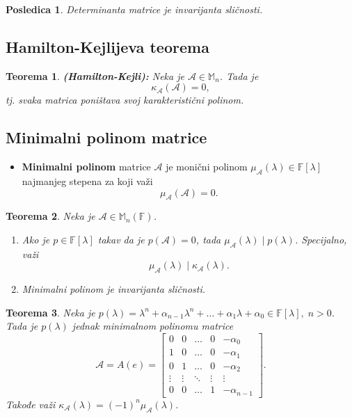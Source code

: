 \documentclass[a4paper,12pt,twoside]{report}
\newtheorem{theorem}{Teorema}[section]
\newtheorem{corollary}{Posledica}[theorem]
\numberwithin{algorithm}{section}
\begin{document}
\begin{corollary}
    Determinanta matrice je invarijanta sličnosti.
\end{corollary}

\subsection{Hamilton-Kejlijeva teorema}

\begin{theorem}
    \textbf{(Hamilton-Kejli):} Neka je $\mathcal{A} \in \mathbb{M}_n$. Tada je \[ \kappa_\mathcal{A}(\mathcal{A}) = 0, \]
    tj. svaka matrica poništava svoj karakteristični polinom.
\end{theorem}

\subsection{Minimalni polinom matrice}

\begin{itemize}
    \item \textbf{Minimalni polinom} matrice $\mathcal{A}$ je monični polinom $\mu_\mathcal{A}(\lambda) \in \mathbb{F}[\lambda]$ 
    najmanjeg stepena za koji važi \[ \mu_\mathcal{A}(\mathcal{A})=0. \]
\end{itemize}

\begin{theorem}
    Neka je $\mathcal{A}\in \mathbb{M}_n(\mathbb{F})$.
    \begin{enumerate}
        \item Ako je $p \in \mathbb{F}[\lambda]$ takav da je $p(\mathcal{A}) = 0$, tada $\mu_\mathcal{A}(\lambda)\;|\;p(\lambda)$.
        Specijalno, važi \[\mu_\mathcal{A}(\lambda)\;|\;\kappa_\mathcal{A}(\lambda).\]
        \item Minimalni polinom je invarijanta sličnosti.
    \end{enumerate}
\end{theorem}

\begin{theorem}
    Neka je $p(\lambda) = \lambda^n + \alpha_{n-1}\lambda^n + \dots + \alpha_1\lambda + \alpha_0 \in \mathbb{F}[\lambda], \; n > 0$.
    Tada je $p(\lambda)$ jednak minimalnom polinomu matrice
    \[\mathcal{A} = A(e) = \begin{bmatrix}
        0 & 0 & \dots & 0 &-\alpha_0 \\
        1 & 0 & \dots & 0 &-\alpha_1 \\
        0 & 1 & \dots & 0 &-\alpha_2\\
        \vdots & \vdots & \ddots & \vdots & \vdots \\
        0 & 0 & \dots & 1 & -\alpha_{n-1}
    \end{bmatrix}.\]
    Takođe važi $\kappa_\mathcal{A}(\lambda) = (-1)^n\mu_\mathcal{A}(\lambda)$.
\end{theorem}
\end{document}
